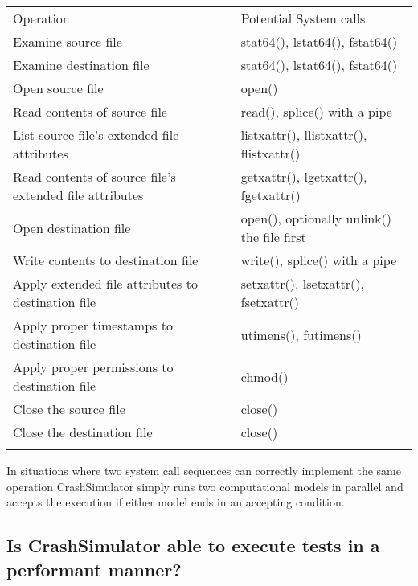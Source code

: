 \begin{table*}[t]
    \scriptsize{}
    \begin{tabular}{l | l }
    \toprule{}
      Operation                                               & Potential System calls\\
      Examine source file                                     & stat64(), lstat64(), fstat64()\\
      Examine destination file                                & stat64(), lstat64(), fstat64()\\
      Open source file                                        & open()\\
      Read contents of source file                            & read(), splice() with a pipe\\
      List source file's extended file attributes             & listxattr(), llistxattr(), flistxattr()\\
      Read contents of source file's extended file attributes & getxattr(), lgetxattr(), fgetxattr()\\
      Open destination file                                   & open(), optionally unlink() the file first\\
      Write contents to destination file                      & write(), splice() with a pipe\\
      Apply extended file attributes to destination file      & setxattr(), lsetxattr(), fsetxattr()\\
      Apply proper timestamps to destination file             & utimens(), futimens()\\
      Apply proper permissions to destination file            & chmod()\\
      Close the source file                                   & close()\\
      Close the destination file                              & close()\\

              
    \bottomrule{}
    \end{tabular}
\end{table*}
    
In situations where two system call sequences can correctly implement the same operation CrashSimulator simply runs
two computational models in parallel and accepts the execution if either model ends in an accepting condition. 




\subsection{Is CrashSimulator able to execute tests in a performant manner?}

